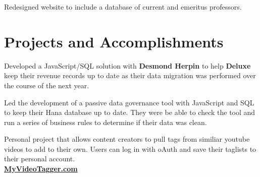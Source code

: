 \documentclass[]{deedy-resume-openfont}
\begin{document}
\begin{minipage}[t]{0.66\textwidth}
\begin{tightemize}
\item Redesigned website to include a database of current and emeritus professors.
\end{tightemize}
\sectionsep


\section{Projects and Accomplishments}
Developed a JavaScript/SQL solution with \textbf{Desmond Herpin} to help \textbf{Deluxe} keep their revenue records up to date as their data migration was performed over the course of the next year.
\sectionsep

Led the development of a passive data governance tool with JavaScript and SQL to keep their Hana database up to date.  They were be able to check the tool and run a series of business rules to determine if their data was clean.
\sectionsep

Personal project that allows content creators to pull tags from similiar youtube videos to add to their own.  Users can log in with  oAuth and save their taglists to their personal account. \\
\href{https://myvideotagger.com}{\bf MyVideoTagger.com}
\sectionsep


\end{minipage} 
\end{document}

